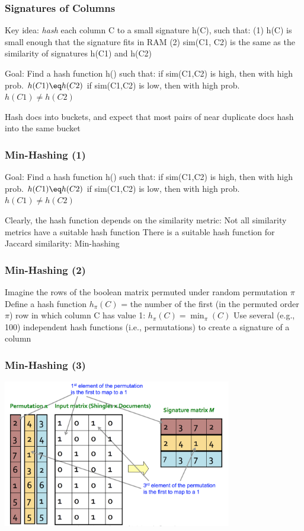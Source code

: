 \documentclass[svgnames]{beamer}
\begin{document}
  
\begin{frame} \frametitle{Signatures of Columns}

Key idea: \emph{hash} each column C to a small signature h(C), such that:
  (1) h(C) is small enough that the signature fits in RAM
  (2) sim(C1, C2) is the same as the similarity of signatures h(C1) and h(C2)

Goal: Find a hash function h() such that:
  if sim(C1,C2) is high, then with high prob. $h(C1) \eq h(C2)$
  if sim(C1,C2) is low, then with high prob. $h(C1) \neq h(C2)$

Hash docs into buckets, and expect that most pairs of near duplicate docs hash into the same bucket

\end{frame}

  
\begin{frame} \frametitle{Min-Hashing (1)}

Goal: Find a hash function h() such that:
  if sim(C1,C2) is high, then with high prob. $h(C1) \eq h(C2)$
  if sim(C1,C2) is low, then with high prob. $h(C1) \neq h(C2)$

Clearly, the hash function depends on the similarity metric:
  Not all similarity metrics have a suitable hash function
  There is a suitable hash function for Jaccard similarity: Min-hashing
  
\end{frame}

  
\begin{frame} \frametitle{Min-Hashing (2)}

Imagine the rows of the boolean matrix permuted under random permutation $\pi$
Define a hash function $h_\pi(C)$ = the number of the first (in the permuted order $\pi$) row in which column C has value 1:
  $h_\pi (C) = \min_\pi(C)$
Use several (e.g., 100) independent hash functions (i.e., permutations) to create a signature of a column

\end{frame}

  
\begin{frame} \frametitle{Min-Hashing (3)}

\includegraphics[width=10cm]{minhash}

\end{frame}
\end{document}
